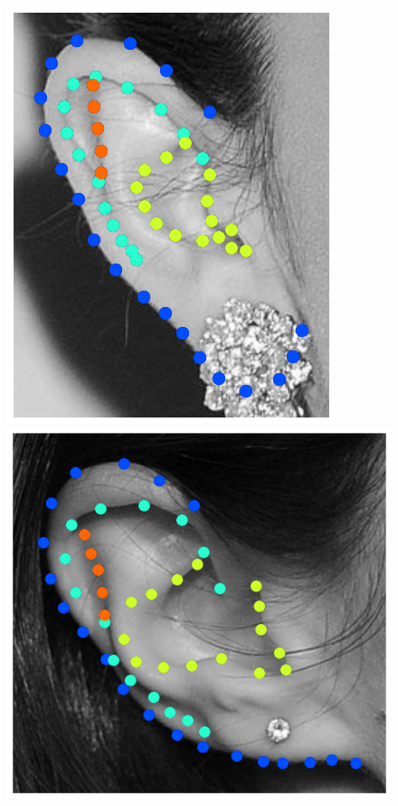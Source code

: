 \begin{figure}
    \includegraphics[height=\flowh]{resources/Ear_Deformable_Model/dbs/db_6}
    \\
    \includegraphics[height=\flowhhh]{resources/Ear_Deformable_Model/dbs/db_7}
    \hfill

\end{figure}
